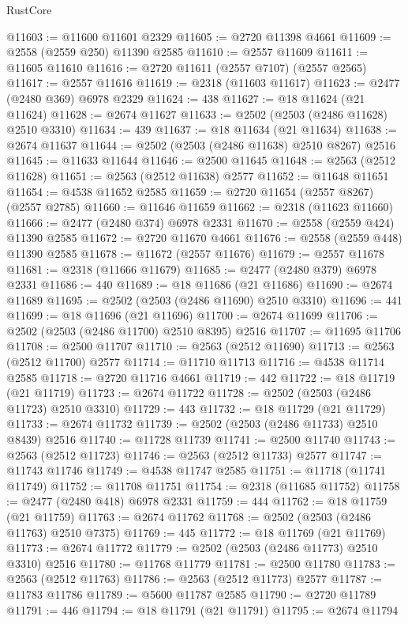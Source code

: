 \begin{lexlean}{RustCore}
\begin{coremodule}
@11603 := @11600 @11601 @2329
@11605 := @2720 @11398 @4661
@11609 := @2558 (@2559 @250) @11390 @2585
@11610 := @2557 @11609
@11611 := @11605 @11610
@11616 := @2720 @11611 (@2557 @7107) (@2557 @2565)
@11617 := @2557 @11616
@11619 := @2318 (@11603 @11617)
@11623 := @2477 (@2480 @369) @6978 @2329
@11624 := 438
@11627 := @18 @11624 (@21 @11624)
@11628 := @2674 @11627
@11633 := @2502 (@2503 (@2486 @11628) @2510 @3310)
@11634 := 439
@11637 := @18 @11634 (@21 @11634)
@11638 := @2674 @11637
@11644 := @2502 (@2503 (@2486 @11638) @2510 @8267) @2516
@11645 := @11633 @11644
@11646 := @2500 @11645
@11648 := @2563 (@2512 @11628)
@11651 := @2563 (@2512 @11638) @2577
@11652 := @11648 @11651
@11654 := @4538 @11652 @2585
@11659 := @2720 @11654 (@2557 @8267) (@2557 @2785)
@11660 := @11646 @11659
@11662 := @2318 (@11623 @11660)
@11666 := @2477 (@2480 @374) @6978 @2331
@11670 := @2558 (@2559 @424) @11390 @2585
@11672 := @2720 @11670 @4661
@11676 := @2558 (@2559 @448) @11390 @2585
@11678 := @11672 (@2557 @11676)
@11679 := @2557 @11678
@11681 := @2318 (@11666 @11679)
@11685 := @2477 (@2480 @379) @6978 @2331
@11686 := 440
@11689 := @18 @11686 (@21 @11686)
@11690 := @2674 @11689
@11695 := @2502 (@2503 (@2486 @11690) @2510 @3310)
@11696 := 441
@11699 := @18 @11696 (@21 @11696)
@11700 := @2674 @11699
@11706 := @2502 (@2503 (@2486 @11700) @2510 @8395) @2516
@11707 := @11695 @11706
@11708 := @2500 @11707
@11710 := @2563 (@2512 @11690)
@11713 := @2563 (@2512 @11700) @2577
@11714 := @11710 @11713
@11716 := @4538 @11714 @2585
@11718 := @2720 @11716 @4661
@11719 := 442
@11722 := @18 @11719 (@21 @11719)
@11723 := @2674 @11722
@11728 := @2502 (@2503 (@2486 @11723) @2510 @3310)
@11729 := 443
@11732 := @18 @11729 (@21 @11729)
@11733 := @2674 @11732
@11739 := @2502 (@2503 (@2486 @11733) @2510 @8439) @2516
@11740 := @11728 @11739
@11741 := @2500 @11740
@11743 := @2563 (@2512 @11723)
@11746 := @2563 (@2512 @11733) @2577
@11747 := @11743 @11746
@11749 := @4538 @11747 @2585
@11751 := @11718 (@11741 @11749)
@11752 := @11708 @11751
@11754 := @2318 (@11685 @11752)
@11758 := @2477 (@2480 @418) @6978 @2331
@11759 := 444
@11762 := @18 @11759 (@21 @11759)
@11763 := @2674 @11762
@11768 := @2502 (@2503 (@2486 @11763) @2510 @7375)
@11769 := 445
@11772 := @18 @11769 (@21 @11769)
@11773 := @2674 @11772
@11779 := @2502 (@2503 (@2486 @11773) @2510 @3310) @2516
@11780 := @11768 @11779
@11781 := @2500 @11780
@11783 := @2563 (@2512 @11763)
@11786 := @2563 (@2512 @11773) @2577
@11787 := @11783 @11786
@11789 := @5600 @11787 @2585
@11790 := @2720 @11789
@11791 := 446
@11794 := @18 @11791 (@21 @11791)
@11795 := @2674 @11794

\end{coremodule}
\end{lexlean}
